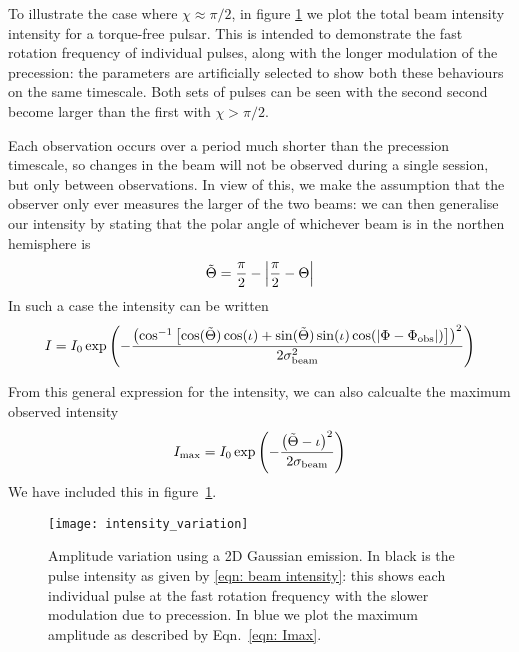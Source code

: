 \documentclass[/home/greg/Thesis/main/main.tex]{subfiles}
\begin{document}
To illustrate the case where $\chi \approx \pi/2$, in figure
\ref{fig: intensity variation} we plot the total beam intensity 
intensity for a torque-free pulsar. This is
intended to demonstrate the fast rotation frequency of individual pulses, along
with the longer modulation of the precession: the parameters are artificially
selected to show both these behaviours on the same timescale. Both sets of pulses
can be seen with the second second become larger than the first with $\chi > \pi/2$.

Each observation occurs over a period much shorter than the
precession timescale, so changes in the beam will not be observed during
a single session, but only between observations. In view of this, we make the
assumption that the observer only ever measures the larger of the two beams: we
can then generalise our intensity by stating that the polar angle of whichever
beam is in the northen hemisphere is 
\begin{align}
\tilde{\Theta} = \frac{\pi}{2} - \left| \frac{\pi}{2} - \Theta\right|
\end{align}
In such a case the intensity can be written
\begin{align}
I = I_0 \exp\left(-\frac{\left(\cos^{-1}\left[\cos(\tilde{\Theta})\cos(\iota) +
                              \sin(\tilde{\Theta})\sin(\iota)\cos(|\Phi - \Phi_{\mathrm{obs}}|)\right]
                         \right)^{2}}{2\sigma_{\textrm{beam}}^{2}}\right)
\label{eqn: General beam intensity}
\end{align}

From this general expression for the intensity, we can also calcualte the 
maximum observed intensity
\newcommand{\repterm}{\left(\ThetaT - \iota\right)^{2}}
\begin{align}
I_\textrm{max} = I_{0} \exp\left(
    -\frac{\repterm}
          {2\sigmaB}\right)
\label{eqn: Imax}
\end{align}
We have included this in figure~\ref{fig: intensity variation}. 

\begin{figure}[htb]
\centering
\texttt{[image: intensity\_variation]}
\caption{Amplitude variation using a 2D Gaussian emission. In black is the pulse
intensity as given by \eqref{eqn: beam intensity}: this shows each individual
pulse at the fast rotation frequency with the slower modulation due to precession. 
In blue we plot the maximum amplitude as described by Eqn.~\eqref{eqn: Imax}.}
\label{fig: intensity variation}
\end{figure}
\end{document}
